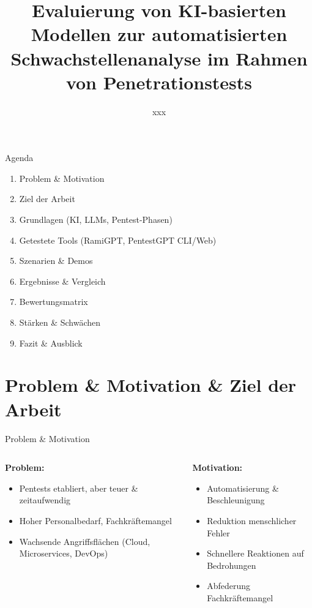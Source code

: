 \documentclass[
	aspectratio=169,	%
	onlytextwidth,		%
	t,					%
	]{beamer}
\title{Evaluierung von KI-basierten Modellen zur automatisierten Schwachstellenanalyse im Rahmen von Penetrationstests}
\author[xxx]{xxx}
\begin{document}
	
\begin{frame}{Agenda}
	\begin{enumerate}
		\item Problem \& Motivation
		\item Ziel der Arbeit
		\item Grundlagen (KI, LLMs, Pentest-Phasen)
		\item Getestete Tools (RamiGPT, PentestGPT CLI/Web)
		\item Szenarien \& Demos
		\item Ergebnisse \& Vergleich
		\item Bewertungsmatrix
		\item Stärken \& Schwächen
		\item Fazit \& Ausblick
	\end{enumerate}
\end{frame}







\section{Problem \& Motivation \& Ziel der Arbeit}
	
\begin{frame}{Problem \& Motivation}
	\begin{columns}
		\begin{column}{0.48\textwidth}
			\textbf{Problem:}
			\begin{itemize}
				\item Pentests etabliert, aber teuer \& zeitaufwendig
				\item Hoher Personalbedarf, Fachkräftemangel
				\item Wachsende Angriffsflächen (Cloud, Microservices, DevOps)
			\end{itemize}
		\end{column}
		\begin{column}{0.48\textwidth}
			\textbf{Motivation:}
			\begin{itemize}
				\item Automatisierung \& Beschleunigung
				\item Reduktion menschlicher Fehler
				\item Schnellere Reaktionen auf Bedrohungen
				\item Abfederung Fachkräftemangel
			\end{itemize}
		\end{column}
	\end{columns}
\end{frame}
\end{document}

